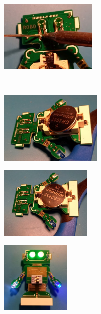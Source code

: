 \documentclass[a4paper]{article}
\begin{document}
\begin{minipage}[t]{0.33\textwidth}
  \centering
  \includegraphics[height=3.5cm]{../pictures/LED8.jpg}
  \label{img:LED8}
\end{minipage}
\ \\
\begin{minipage}[t]{0.33\textwidth}
  \centering
  \includegraphics[height=3.5cm]{../pictures/Bat4.jpg}
  \label{img:Bat4}
  \end{minipage}
\begin{minipage}[t]{0.33\textwidth}
  \centering
  \includegraphics[height=3.5cm]{../pictures/Bat5.jpg}
  \label{img:Bat5}
\end{minipage}
\begin{minipage}[t]{0.33\textwidth}
  \centering
  \includegraphics[height=3.5cm]{../pictures/Ready.jpg}
  \label{img:Ready}
\end{minipage}
\end{document}
